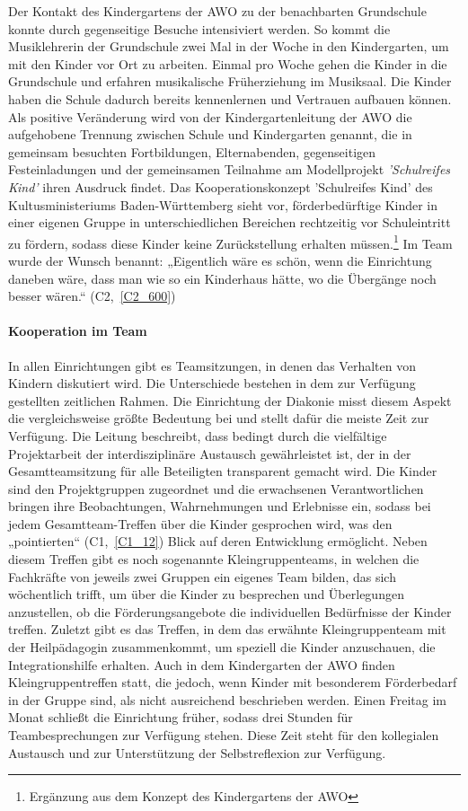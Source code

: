 Der Kontakt des Kindergartens der AWO zu der benachbarten Grundschule konnte durch gegenseitige Besuche intensiviert werden. So kommt die Musiklehrerin der Grundschule zwei Mal in der Woche in den Kindergarten, um mit den Kinder vor Ort zu arbeiten. Einmal pro Woche gehen die Kinder in die Grundschule und erfahren musikalische Früherziehung im Musiksaal. Die Kinder haben die Schule dadurch bereits kennenlernen und Vertrauen aufbauen können.
Als positive Veränderung wird von der Kindergartenleitung der AWO die aufgehobene Trennung zwischen Schule und Kindergarten genannt, die in gemeinsam besuchten Fortbildungen, Elternabenden, gegenseitigen Festeinladungen und der gemeinsamen Teilnahme am Modellprojekt \emph{'Schulreifes Kind'} ihren Ausdruck findet. Das Kooperationskonzept 'Schulreifes Kind' des Kultusministeriums Baden-Württemberg sieht vor, förderbedürftige Kinder in einer eigenen Gruppe in unterschiedlichen Bereichen rechtzeitig vor Schuleintritt zu fördern, sodass diese Kinder keine Zurückstellung erhalten müssen.\footnote{Ergänzung aus dem Konzept des Kindergartens der AWO} Im Team wurde der Wunsch benannt: „Eigentlich wäre es schön, wenn die Einrichtung daneben wäre, dass man wie so ein Kinderhaus hätte, wo die Übergänge noch besser wären.“ (C2,~\ref{C2_600}) 

\paragraph{Kooperation im Team}

In allen Einrichtungen gibt es Teamsitzungen, in denen das Verhalten von Kindern diskutiert wird. Die Unterschiede bestehen in dem zur Verfügung gestellten zeitlichen Rahmen. Die Einrichtung der Diakonie
misst diesem Aspekt die vergleichsweise größte Bedeutung bei und stellt dafür die meiste Zeit zur Verfügung. Die Leitung beschreibt, dass bedingt durch die vielfältige Projektarbeit der interdisziplinäre Austausch gewährleistet ist, der in der Gesamtteamsitzung für alle Beteiligten transparent gemacht wird. Die Kinder sind den Projektgruppen zugeordnet und die erwachsenen Verantwortlichen bringen ihre Beobachtungen, Wahrnehmungen und Erlebnisse ein, sodass bei jedem Gesamtteam-Treffen über die Kinder gesprochen wird, was den „pointierten“ (C1,~\ref{C1_12}) Blick auf deren Entwicklung ermöglicht. Neben diesem Treffen gibt es noch sogenannte Kleingruppenteams, in welchen die Fachkräfte von jeweils zwei Gruppen ein eigenes Team bilden, das sich wöchentlich trifft, um über die Kinder zu besprechen und Überlegungen anzustellen, ob die Förderungsangebote die individuellen Bedürfnisse der Kinder treffen. Zuletzt gibt es das Treffen, in dem das erwähnte Kleingruppenteam mit der Heilpädagogin zusammenkommt, um speziell die Kinder anzuschauen, die Integrationshilfe erhalten. 
Auch in dem Kindergarten der AWO finden Kleingruppentreffen statt, die jedoch, wenn Kinder mit besonderem Förderbedarf in der Gruppe sind, als nicht ausreichend beschrieben werden.    
Einen Freitag im Monat schließt die Einrichtung früher, sodass drei Stunden für Teambesprechungen zur Verfügung stehen. Diese Zeit steht für den kollegialen Austausch und zur Unterstützung der Selbstreflexion zur Verfügung.  

